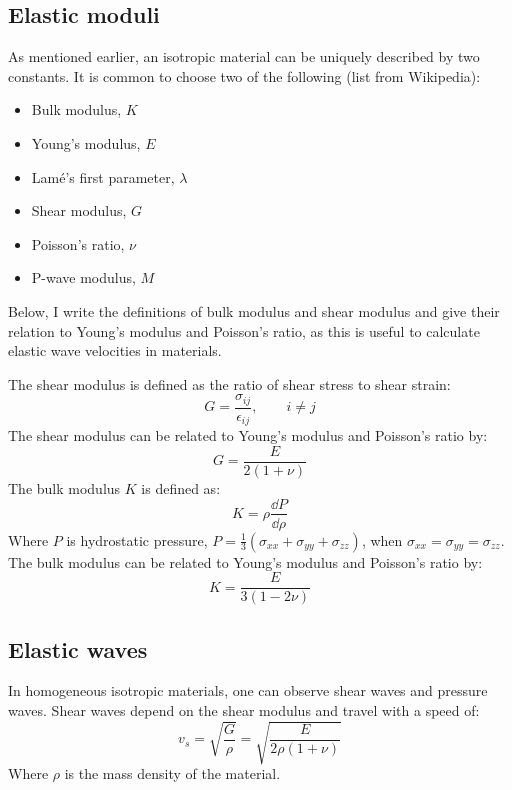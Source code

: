 \subsection{Elastic moduli}
As mentioned earlier, an isotropic material can be uniquely described by two constants. It is common to choose two of the following (list from Wikipedia):
\begin{itemize}
\item Bulk modulus, $K$
\item Young's modulus, $E$
\item Lamé's first parameter, $\lambda$
\item Shear modulus, $G$
\item Poisson's ratio, $\nu$
\item P-wave modulus, $M$
\end{itemize}

Below, I write the definitions of bulk modulus and shear modulus and give their relation to Young's modulus and Poisson's ratio, as this is useful to calculate elastic wave velocities in materials.

The shear modulus is defined as the ratio of shear stress to shear strain:
\begin{equation}
	G = \frac{\sigma_{ij}}{\epsilon_{ij}}, \qquad i\neq j
\end{equation}
The shear modulus can be related to Young's modulus and Poisson's ratio by:
\begin{equation}
	G = \frac{E}{2(1+\nu)}
\end{equation}
The bulk modulus $K$ is defined as:
\begin{equation}
	K = \rho\frac{\dd P}{\dd \rho}
\end{equation}
Where $P$ is hydrostatic pressure, $P = \frac{1}{3} \left(\sigma_{xx}+\sigma_{yy}+\sigma_{zz}\right)$, when $\sigma_{xx} = \sigma_{yy} = \sigma_{zz}$.
The bulk modulus can be related to Young's modulus and Poisson's ratio by:\begin{equation}
	K = \frac{E}{3(1-2\nu)}
\end{equation}

\subsection{Elastic waves}
In homogeneous isotropic materials, one can observe shear waves and pressure waves. Shear waves depend on the shear modulus and travel with a speed of:
\begin{equation}
	v_s = \sqrt{\frac{G}{\rho}} = \sqrt{\frac{E}{2\rho(1+\nu)}}
\end{equation}
Where $\rho$ is the mass density of the material.

